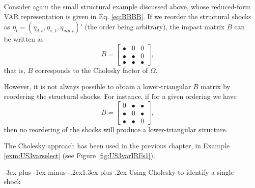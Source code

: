 \documentclass[
  11pt,
]{book}
\makeatletter
\renewcommand\section{\@startsection{section}{1}{\z@}
  {-3ex plus -1ex minus -.2ex}{1.3ex plus .2ex}
  {\normalfont\Large\bfseries\color{TextbookInk}}}
\theoremstyle{definition}
\theoremstyle{definition}
\theoremstyle{definition}
\theoremstyle{definition}
\theoremstyle{remark}
\makeatother
\begin{document}
Consider again the small structural example discussed above, whose reduced-form VAR representation is given in Eq. \eqref{eq:BBBB}. If we reorder the structural shocks as \(\eta_t = (\eta_{d,t},\eta_{\pi,t},\eta_{mp,t})'\) (the order being arbitrary), the impact matrix \(B\) can be written as
\[
B = \begin{bmatrix}
\bullet & 0 & 0 \\
\bullet & \bullet & 0 \\
\bullet & \bullet & \bullet
\end{bmatrix},
\]
that is, \(B\) corresponds to the Cholesky factor of \(\Omega\).

However, it is not always possible to obtain a lower-triangular \(B\) matrix by reordering the structural shocks. For instance, if for a given ordering we have
\[
B = \begin{bmatrix}
0 & \bullet & \bullet \\
\bullet & 0 & \bullet \\
\bullet & \bullet & 0
\end{bmatrix},
\]
then no reordering of the shocks will produce a lower-triangular structure.

The Cholesky approach has been used in the previous chapter, in Example \ref{exm:US3varselect} (see Figure \ref{fig:US3varIRFs1}).

\section{Using Cholesky to identify a single shock}\label{Cholesky1}
\end{document}
